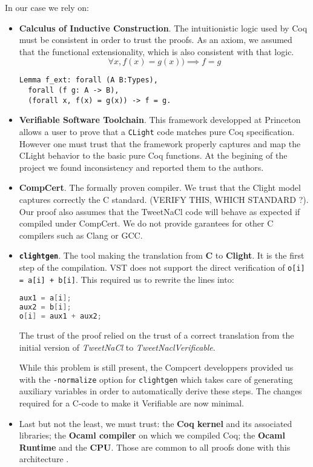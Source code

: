 In our case we rely on:
\begin{itemize}
  \item \textbf{Calculus of Inductive Construction}. The intuitionistic logic
  used by Coq must be consistent in order to trust the proofs. As an axiom,
  we assumed that the functional extensionality, which is also consistent with that logic.
  $$\forall x, f(x) = g(x) ) \implies f = g$$
\begin{lstlisting}[language=Coq]
Lemma f_ext: forall (A B:Types),
  forall (f g: A -> B),
  (forall x, f(x) = g(x)) -> f = g.
\end{lstlisting}

  \item \textbf{Verifiable Software Toolchain}. This framework developped at
  Princeton allows a user to prove that a \texttt{CLight} code matches pure Coq
  specification. However one must trust that the framework properly captures and
  map the CLight behavior to the basic pure Coq functions. At the begining of
  the project we found inconsistency and reported them to the authors.

  \item \textbf{CompCert}. The formally proven compiler. We trust that the Clight
  model captures correctly the C standard. (VERIFY THIS, WHICH STANDARD ?).
  Our proof also assumes that the TweetNaCl code will behave as expected if
  compiled under CompCert. We do not provide garantees for other C compilers
  such as Clang or GCC.

  \item \textbf{\texttt{clightgen}}. The tool making the translation from \textbf{C} to
  \textbf{Clight}. It is the first step of the compilation.
  VST does not support the direct verification of \texttt{o[i] = a[i] + b[i]}.
  This required us to rewrite the lines into:
\begin{lstlisting}[language=C]
aux1 = a[i];
aux2 = b[i];
o[i] = aux1 + aux2;
\end{lstlisting}
  The trust of the proof relied on the trust of a correct translation from the
  initial version of \textit{TweetNaCl} to \textit{TweetNaclVerificable}.

  While this problem is still present, the Compcert developpers provided us with
  the \texttt{-normalize} option for \texttt{clightgen} which takes care of
  generating auxiliary variables in order to automatically derive these steps.
  The changes required for a C-code to make it Verifiable are now minimal.

  \item Last but not the least, we must trust: the \textbf{Coq kernel} and its
  associated libraries; the \textbf{Ocaml compiler} on which we compiled Coq;
  the \textbf{Ocaml Runtime} and the \textbf{CPU}. Those are common to all proofs
  done with this architecture \cite{2015-Appel,coq-faq}.
\end{itemize}

